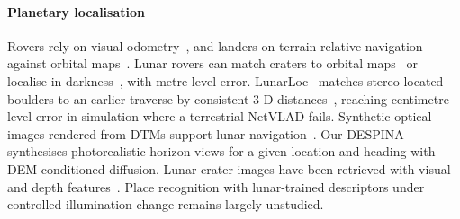 \paragraph*{Planetary localisation}
Rovers rely on visual odometry~\cite{maimone2007mer}, and landers on terrain-relative navigation
against orbital maps~\cite{johnson2008trn}. Lunar rovers can match craters to orbital maps~\cite{daftry2023lunarnav} or
localise in darkness~\cite{atha2024shadownav}, with metre-level error. LunarLoc~\cite{thomas2026lunarloc}
matches stereo-located boulders to an earlier traverse by consistent 3-D distances~\cite{lusk2021clipper},
reaching centimetre-level error in simulation where a terrestrial NetVLAD fails. Synthetic optical images rendered from DTMs support lunar
navigation~\cite{ceresoli2025optical}. Our DESPINA~\cite{nelsonarcher2026despina} synthesises
photorealistic horizon views for a given location and heading with DEM-conditioned diffusion.
Lunar crater images have been retrieved with visual and depth features~\cite{lunarcomplexfeatures}.
Place recognition with lunar-trained descriptors under controlled illumination change remains largely
unstudied.
